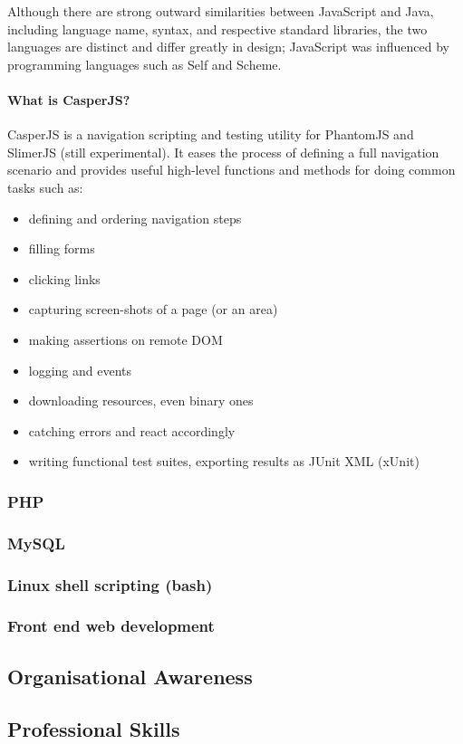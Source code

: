 \documentclass{article}
\begin{document}
	Although there are strong outward similarities between JavaScript and Java, including language name, syntax, and respective standard libraries, the two languages are distinct and differ greatly in design; JavaScript was influenced by programming languages such as Self and Scheme.
	
	\paragraph{What is CasperJS?}
	CasperJS is a navigation scripting and testing utility for PhantomJS and SlimerJS (still experimental). It eases the process of defining a full navigation scenario and provides useful high-level functions and methods for doing common tasks such as:
	\begin{itemize}
		\item defining and ordering navigation steps
		\item filling forms
		\item clicking links
		\item capturing screen-shots of a page (or an area)
		\item making assertions on remote DOM
		\item logging and events
		\item downloading resources, even binary ones
		\item catching errors and react accordingly
		\item writing functional test suites, exporting results as JUnit XML (xUnit)
	\end{itemize}
	\begin{center}
		
	\end{center}
	
	\subsubsection{PHP}
	\subsubsection{MySQL}
	\subsubsection{Linux shell scripting (bash)}
	\subsubsection{Front end web development}
	\subsection{Organisational Awareness}
	\subsection{Professional Skills}
	
	
\end{document}

